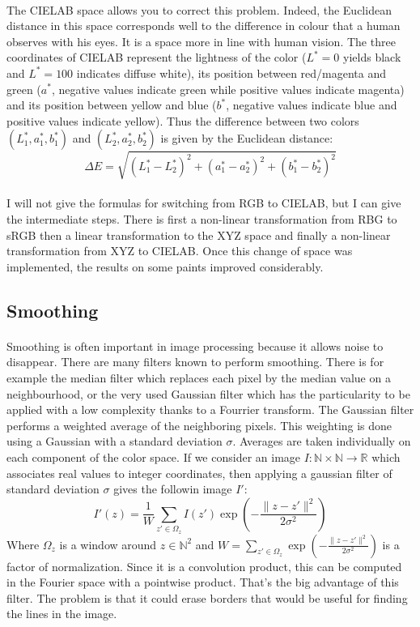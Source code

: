 \documentclass[11pt]{article}
\newcommand{\N}{\mathbb{N}}
\newcommand{\R}{\mathbb{R}}
\begin{document}
	\paragraph{}
	The CIELAB space \cite{cielab} allows you to correct this problem. Indeed, the Euclidean distance in this space corresponds well to the difference in colour that a human observes with his eyes. It is a space more in line with human vision. The three coordinates of CIELAB represent the lightness of the color ($L^* = 0$ yields black and $L^* = 100$ indicates diffuse white), its position between red/magenta and green ($a^*$, negative values indicate green while positive values indicate magenta) and its position between yellow and blue ($b^*$, negative values indicate blue and positive values indicate yellow). Thus the difference between two colors $(L_1^*, a_1^*, b_1^*)$ and $(L_2^*, a_2^*, b_2^*)$ is given by the Euclidean distance:
	$$ \Delta E = \sqrt{(L_1^* - L_2^*)^2 + (a_1^* - a_2^*)^2 + (b_1^* - b_2^*)^2} $$
	
	\paragraph{}
	I will not give the formulas for switching from RGB to CIELAB, but I can give the intermediate steps. There is first a non-linear transformation from RBG to sRGB then a linear transformation to the XYZ space and finally a non-linear transformation from XYZ to CIELAB. Once this change of space was implemented, the results on some paints improved considerably.
	
	\subsection{Smoothing}
	
	\paragraph{}
	Smoothing is often important in image processing because it allows noise to disappear. There are many filters known to perform smoothing. There is for example the median filter which replaces each pixel by the median value on a neighbourhood, or the very used Gaussian filter which has the particularity to be applied with a low complexity thanks to a Fourrier transform. The Gaussian filter performs a weighted average of the neighboring pixels. This weighting is done using a Gaussian with a standard deviation $\sigma$. Averages are taken individually on each component of the color space. If we consider an image $I : \N \times \N \rightarrow \R$ which associates real values to integer coordinates, then applying a gaussian filter of standard deviation $\sigma$ gives the followin image $I'$:
	$$ I'(z) = \dfrac{1}{W} \sum_{z' \in \Omega_{z}} I(z') \exp \left( - \dfrac{\| z - z'\|^2}{2 \sigma^2} \right) $$
	Where $\Omega_{z}$ is a window around $z \in \N^2$ and $W = \sum_{z' \in \Omega_{z}} \exp \left( - \frac{\| z - z'\|^2}{2 \sigma^2} \right)$ is a factor of normalization. Since it is a convolution product, this can be computed in the Fourier space with a pointwise product. That's the big advantage of this filter. The problem is that it could erase borders that would be useful for finding the lines in the image.
	
\end{document}

